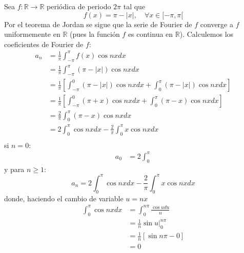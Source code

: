 \documentclass[12pt]{report}
\theoremstyle{largebreak}
\renewcommand{\geq}{\ensuremath{\geqslant}}
\newcommand\abs[1]{\ensuremath{\left|#1\right|}}
\newcommand\cf[3]{\ensuremath{#1:#2\rightarrow#3}}
\begin{document}
    \begin{exa}
        Sea $\cf{f}{\mathbb{R}}{\mathbb{R}}$ periódica de periodo $2\pi$ tal que
        \begin{equation*}
            f(x)=\pi-\abs{x},\quad\forall x\in[-\pi,\pi[
        \end{equation*}
        Por el teorema de Jordan se sigue que la serie de Fourier de $f$ converge a $f$ uniformemente en $\mathbb{R}$ (pues la función $f$ es continua en $\mathbb{R}$). Calculemos los coeficientes de Fourier de $f$:
        \begin{equation*}
            \begin{split}
                a_n&=\frac{1}{\pi}\int_{ -\pi}^\pi f(x)\cos nxdx\\
                &=\frac{1}{\pi}\int_{ -\pi}^\pi (\pi-\abs{x})\cos nxdx\\
                &=\frac{1}{\pi}\left[\int_{ -\pi}^0 (\pi-\abs{x})\cos nxdx+\int_{0}^\pi (\pi-\abs{x})\cos nxdx\right]\\
                &=\frac{1}{\pi}\left[\int_{ -\pi}^0 (\pi+x)\cos nxdx+\int_{0}^\pi (\pi-x)\cos nxdx\right]\\
                &=\frac{2}{\pi}\int_0^{\pi}(\pi-x)\cos nxdx\\
                &=2\int_0^{\pi}\cos nxdx-\frac{2}{\pi}\int_{0}^\pi x\cos nxdx \\
            \end{split}
        \end{equation*}
        si $n=0$:
        \begin{equation*}
            \begin{split}
                a_0&=2\int_0^{\pi}
            \end{split}
        \end{equation*}
        y para $n\geq1$:
        \begin{equation*}
            a_n=2\int_0^{\pi}\cos nxdx-\frac{2}{\pi}\int_{0}^\pi x\cos nxdx
        \end{equation*}
        donde, haciendo el cambio de variable $u=nx$
        \begin{equation*}
            \begin{split}
                \int_0^{\pi}\cos nxdx&=\int_0^{ n\pi}\frac{\cos udu}{n}\\
                &=\frac{1}{n}\sin u\Big|_0^{n\pi}\\
                &=\frac{1}{n}[\sin n\pi-0]\\
                &=0\\

\end{split}
\end{equation*}
\end{exa}
\end{document}
